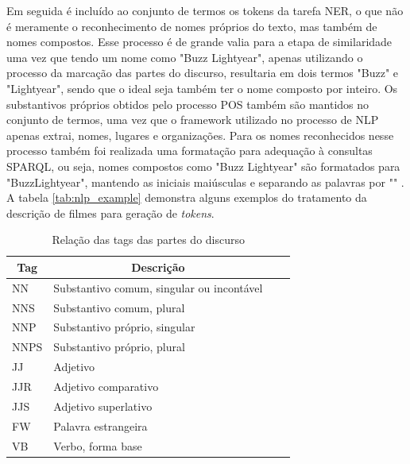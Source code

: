 Em seguida é incluído ao conjunto de termos os tokens da tarefa \ac{NER}, o que não é meramente o reconhecimento de nomes próprios do texto, mas também de nomes compostos. Esse processo é de grande valia para a etapa de similaridade uma vez que tendo um nome como "Buzz Lightyear", apenas utilizando o processo da marcação das partes do discurso, resultaria em dois termos "Buzz" e "Lightyear", sendo que o ideal seja também ter o nome composto por inteiro. Os substantivos próprios obtidos pelo processo \ac{POS} também são mantidos no conjunto de termos, uma vez que o framework utilizado no processo de \ac{NLP} apenas extrai, nomes, lugares e organizações. Para os nomes reconhecidos nesse processo também foi realizada uma formatação para adequação à consultas \ac{SPARQL}, ou seja, nomes compostos como "Buzz Lightyear" são formatados para "Buzz\textunderscore Lightyear", mantendo as iniciais maiúsculas e separando as palavras por "\textunderscore" . A tabela \ref{tab:nlp_example} demonstra alguns exemplos do tratamento da descrição de filmes para geração de \textit{tokens}.

\begin{table}[H]
	\centering
	\caption{Relação das tags das partes do discurso}
	\def\arraystretch{1.3} %
	\begin{tabular}{| m{1.3cm} | m{9.4cm}| c | m{2cm}}
		\hline
		\multicolumn{1}{|c|}{\bfseries Tag} & \multicolumn{1}{c|}{\bfseries Descrição} \\ \hline
		NN & Substantivo comum, singular ou incontável \\ \hline
		NNS	& Substantivo comum, plural \\ \hline
		NNP	& Substantivo próprio, singular \\ \hline
		NNPS & Substantivo próprio, plural \\ \hline
		JJ & Adjetivo \\ \hline
		JJR & Adjetivo comparativo \\ \hline
		JJS & Adjetivo superlativo \\ \hline
		FW & Palavra estrangeira \\ \hline
		VB & Verbo, forma base \\ \hline
	\end{tabular}
\label{tab:nlp_tags}
\end{table}

